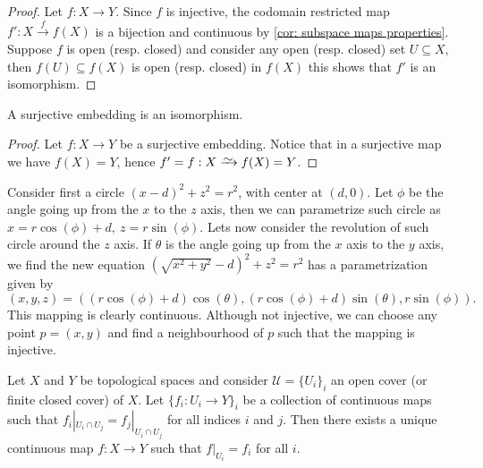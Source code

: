 \begin{proof}
Let \(f: X \to Y\). Since \(f\) is injective, the codomain restricted map
\(f': X \xrightarrow f f(X)\) is a bijection and continuous by \cref{cor:
subspace maps properties}. Suppose \(f\) is open (resp. closed) and consider
any open (resp. closed) set \(U \subseteq X\), then \(f(U) \subseteq f(X)\) is
open (resp. closed) in \(f(X)\) this shows that \(f'\) is an isomorphism.
\end{proof}

\begin{proposition}
A surjective embedding is an isomorphism.
\end{proposition}

\begin{proof}
Let \(f: X \to Y\) be a surjective embedding. Notice that in a surjective map
we have \(f(X) = Y\), hence \(f' = f : X \isoto f(X) = Y\).
\end{proof}

\begin{example}
Consider first a circle \((x - d)^2 + z^2 = r^2\), with center at \((d, 0)\).
Let \(\phi\) be the angle going up from the \(x\) to the \(z\) axis, then we
can parametrize such circle as \(x = r \cos(\phi) + d,\ z = r\sin(\phi)\).
Lets now consider the revolution of such circle around the \(z\) axis. If
\(\theta\) is the angle going up from the \(x\) axis to the \(y\) axis, we
find the new equation \((\sqrt{x^2 + y^2} - d)^2 + z^2 = r^2\) has a
parametrization given by
\[
  (x, y, z) = ((r \cos(\phi) + d)\cos(\theta), (r\cos(\phi) + d)\sin(\theta),
  r\sin(\phi)).
\]
This mapping is clearly continuous. Although not injective, we can choose any
point \(p = (x, y)\) and find a neighbourhood of \(p\) such that the mapping
is injective.
\end{example}

\begin{lemma}[Gluing]
Let \(X\) and \(Y\) be topological spaces and consider
\(\mathcal U = \{U_i\}_i\) an open cover (or finite closed cover) of \(X\). Let
\(\{f_i: U_i \to Y\}_i\) be a collection of continuous maps such that
\(f_i|_{U_i \cap U_j} = f_j|_{U_i \cap U_j}\) for all indices \(i\) and
\(j\). Then there exists a unique continuous map \(f: X \to Y\) such that
\(f|_{U_i} = f_i\) for all \(i\).
\end{lemma}

